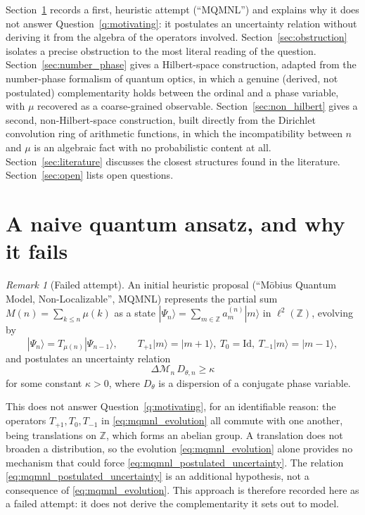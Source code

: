 \documentclass[11pt]{amsart}
\numberwithin{equation}{section}
\theoremstyle{plain}
\theoremstyle{definition}
\theoremstyle{remark}
\newtheorem{remark}[theorem]{Remark}
\newcommand{\Z}{\mathbb{Z}}
\begin{document}
Section~\ref{sec:naive_ansatz} records a first, heuristic attempt
(``MQMNL'') and explains why it does not answer
Question~\ref{q:motivating}: it postulates an uncertainty relation
without deriving it from the algebra of the operators involved.
Section~\ref{sec:obstruction} isolates a precise obstruction to the
most literal reading of the question. Section~\ref{sec:number_phase}
gives a Hilbert-space construction, adapted from the number-phase
formalism of quantum optics, in which a genuine (derived, not
postulated) complementarity holds between the ordinal and a phase
variable, with $\mu$ recovered as a coarse-grained observable.
Section~\ref{sec:non_hilbert} gives a second, non-Hilbert-space
construction, built directly from the Dirichlet convolution ring of
arithmetic functions, in which the incompatibility between $n$ and
$\mu$ is an algebraic fact with no probabilistic content at all.
Section~\ref{sec:literature} discusses the closest structures found in
the literature. Section~\ref{sec:open} lists open questions.

\section{A naive quantum ansatz, and why it fails}
\label{sec:naive_ansatz}

\begin{remark}[Failed attempt]
\label{rem:failed_mqmnl}
An initial heuristic proposal (``M\"obius Quantum Model, Non-Localizable'',
MQMNL) represents the partial sum $M(n)=\sum_{k\le n}\mu(k)$ as a state
$|\Psi_n\rangle=\sum_{m\in\Z}a_m^{(n)}|m\rangle$ in $\ell^2(\Z)$,
evolving by
\begin{equation}
|\Psi_n\rangle = T_{\mu(n)}|\Psi_{n-1}\rangle,
\qquad
T_{+1}|m\rangle=|m+1\rangle,\
T_{0}=\mathrm{Id},\
T_{-1}|m\rangle=|m-1\rangle,
\label{eq:mqmnl_evolution}
\end{equation}
and postulates an uncertainty relation
\begin{equation}
\Delta\mathcal{M}_n \, D_{\theta,n} \geq \kappa
\label{eq:mqmnl_postulated_uncertainty}
\end{equation}
for some constant $\kappa>0$, where $D_\theta$ is a dispersion of a
conjugate phase variable.

This does not answer Question~\ref{q:motivating}, for an identifiable
reason: the operators $T_{+1},T_0,T_{-1}$ in \eqref{eq:mqmnl_evolution}
all commute with one another, being translations on $\Z$, which forms
an abelian group. A translation does not broaden a distribution, so
the evolution \eqref{eq:mqmnl_evolution} alone provides no mechanism
that could force \eqref{eq:mqmnl_postulated_uncertainty}. The relation
\eqref{eq:mqmnl_postulated_uncertainty} is an additional hypothesis,
not a consequence of \eqref{eq:mqmnl_evolution}. This approach is
therefore recorded here as a failed attempt: it does not derive the
complementarity it sets out to model.
\end{remark}
\end{document}

